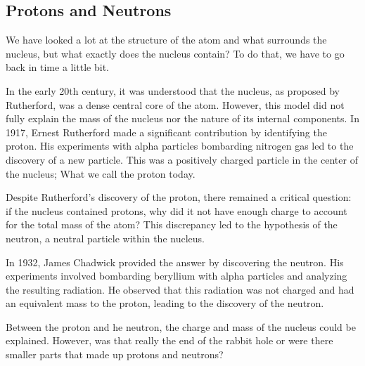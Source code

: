 \subsection{Protons and Neutrons}

We have looked a lot at the structure of the atom and what surrounds the nucleus, but what exactly does the nucleus contain?
To do that, we have to go back in time a little bit.

In the early 20th century, it was understood that the nucleus, as proposed by Rutherford, was a dense central core of the atom.
However, this model did not fully explain the mass of the nucleus nor the nature of its internal components.
In 1917, Ernest Rutherford made a significant contribution by identifying the proton.
His experiments with alpha particles bombarding nitrogen gas led to the discovery of a new particle.
This was a positively charged particle in the center of the nucleus; What we call the proton today.

Despite Rutherford's discovery of the proton, there remained a critical question: if the nucleus contained protons, why did it not have enough charge to account for the total mass of the atom? This discrepancy led to the hypothesis of the neutron, a neutral particle within the nucleus.

In 1932, James Chadwick provided the answer by discovering the neutron.
His experiments involved bombarding beryllium with alpha particles and analyzing the resulting radiation.
He observed that this radiation was not charged and had an equivalent mass to the proton, leading to the discovery of the neutron.

Between the proton and he neutron, the charge and mass of the nucleus could be explained.
However, was that really the end of the rabbit hole or were there smaller parts that made up protons and neutrons?




